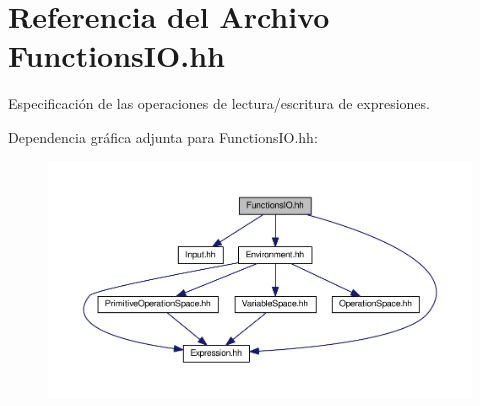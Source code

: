 \hypertarget{_functions_i_o_8hh}{}\section{Referencia del Archivo Functions\+I\+O.\+hh}
\label{_functions_i_o_8hh}


Especificación de las operaciones de lectura/escritura de expresiones.  


Dependencia gráfica adjunta para Functions\+I\+O.\+hh\+:\nopagebreak
\begin{figure}[H]
\begin{center}
\leavevmode
\includegraphics[width=350pt]{_functions_i_o_8hh__incl}
\end{center}
\end{figure}
